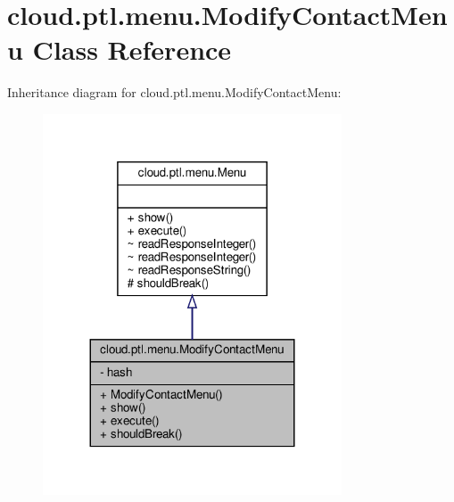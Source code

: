 \hypertarget{classcloud_1_1ptl_1_1menu_1_1ModifyContactMenu}{}\section{cloud.\+ptl.\+menu.\+Modify\+Contact\+Menu Class Reference}
\label{classcloud_1_1ptl_1_1menu_1_1ModifyContactMenu}


Inheritance diagram for cloud.\+ptl.\+menu.\+Modify\+Contact\+Menu\+:
\nopagebreak
\begin{figure}[H]
\begin{center}
\leavevmode
\includegraphics[width=251pt]{classcloud_1_1ptl_1_1menu_1_1ModifyContactMenu__inherit__graph}
\end{center}
\end{figure}


